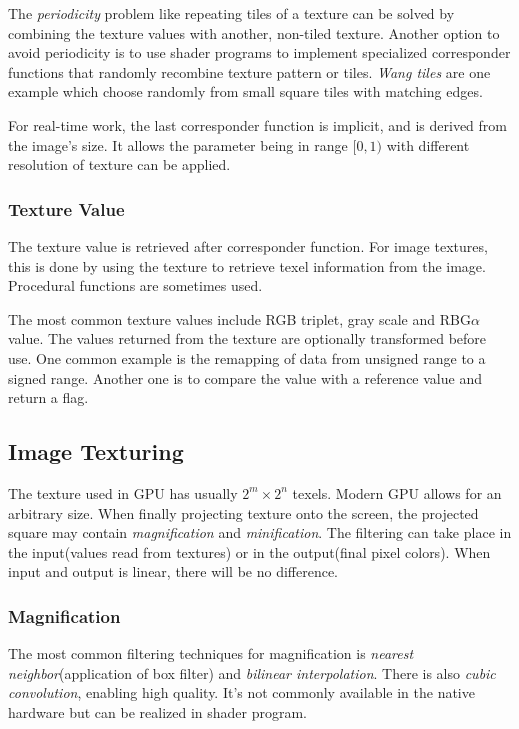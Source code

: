 \documentclass[10pt, a4paper]{article}
\begin{document}
        The \emph{periodicity} problem like repeating tiles of a texture can be solved by combining the texture values with another, non-tiled texture. Another option to avoid periodicity is to use shader programs to implement specialized corresponder functions that randomly recombine texture pattern or tiles. \emph{Wang tiles} are one example which choose randomly from small square tiles with matching edges. 

        For real-time work, the last corresponder function is implicit, and is derived from the image's size. It allows the parameter being in range  $[0, 1)$ with different resolution of texture can be applied. 
\subsubsection{Texture Value}
    The texture value is retrieved after corresponder function. For image textures, this is done by using the texture to retrieve texel information from the image. Procedural functions are sometimes used. 
    
    The most common texture values include RGB triplet, gray scale and RBG$\alpha$ value. The values returned from the texture are optionally transformed before use. One common example is the remapping of data from unsigned range to a signed range. Another one is to compare the value with a reference value and return a flag.
    
\subsection{Image Texturing}
The texture used in GPU has usually $2^m \times 2^n$ texels. Modern GPU allows for an arbitrary size. When finally projecting texture onto the screen, the projected square may contain \emph{magnification} and \emph{minification}. The filtering can take place in the input(values read from  textures) or in the output(final pixel colors). When input and output is linear, there will be no difference. 

\subsubsection{Magnification}
    The most common filtering techniques for magnification is \emph{nearest neighbor}(application of box filter) and \emph{bilinear interpolation}. There is also \emph{cubic convolution}, enabling high quality. It's not commonly available in the native hardware but can be realized in shader program. 
    
\end{document}
